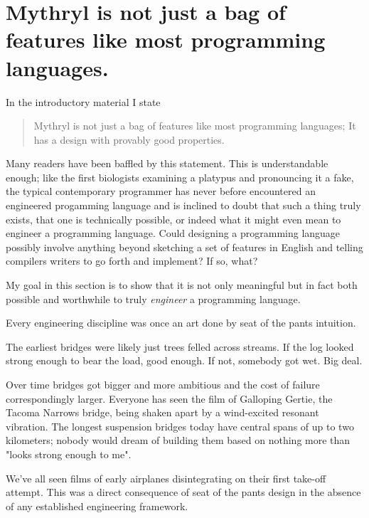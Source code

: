 \section{Mythryl is not just a bag of features like most programming languages.}
\label{section:notes:engineered}


In the introductory material I state 
\begin{quotation}
Mythryl is not just a bag of features like most programming languages;\newline
It has a design with provably good properties.
\end{quotation}

Many readers have been baffled by this statement.  This is 
understandable enough; like the first biologists examining a platypus 
and pronouncing it a fake, the typical contemporary programmer has 
never before encountered an engineered progamming language and is 
inclined to doubt that such a thing truly exists, that one is 
technically possible, or indeed what it might even mean to engineer a 
programming language.  Could designing a programming language possibly 
involve anything beyond sketching a set of features in English and 
telling compilers writers to go forth and implement? If so, what? 

My goal in this section is to show that it is not only meaningful 
but in fact both possible  and worthwhile to truly {\it engineer} 
a programming language. 

Every engineering discipline was once an art done by seat of 
the pants intuition.

The earliest bridges were likely just trees felled across streams.  If 
the log looked strong enough to bear the load, good enough.  If not, 
somebody got wet.  Big deal. 

Over time bridges got bigger and more ambitious and the cost of 
failure correspondingly larger.  Everyone has seen the film of 
Galloping Gertie, the Tacoma Narrows bridge, being shaken apart by a 
wind-excited resonant vibration. The longest suspension bridges today have 
central spans of up to two kilometers; nobody would dream of building 
them based on nothing more than "looks strong enough to me". 

We've all seen films of early airplanes disintegrating on their 
first take-off attempt.  This was a direct consequence of 
seat of the pants design in the absence of any established 
engineering framework. 

